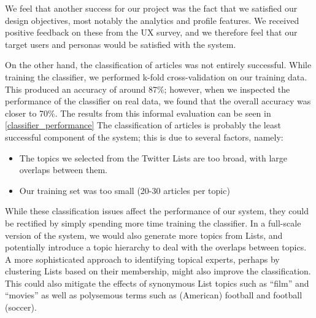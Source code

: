 \documentclass[11pt]{article}
\begin{document}
We feel that another success for our project was the fact that we satisfied our design objectives, most notably the analytics and profile features. We received positive feedback on these from the UX survey, and we therefore feel that our target users and personas would be satisfied with the system.

On the other hand, the classification of articles was not entirely successful. While training the classifier, we performed k-fold cross-validation on our training data. This produced an accuracy of around 87\%; however, when we inspected the performance of the classifier on real data, we found that the overall accuracy was closer to 70\%. The results from this informal evaluation can be seen in \cref{classifier_performance} The classification of articles is probably the least successful component of the system; this is due to several factors, namely:
\begin{itemize}
\item The topics we selected from the Twitter Lists are too broad, with large overlaps between them. 

\item Our training set was too small (20-30 articles per topic)
\end{itemize}
While these classification issues affect the performance of our system, they could be rectified by simply spending more time training the classifier. In a full-scale version of the system, we would also generate more topics from Lists, and potentially introduce a topic hierarchy to deal with the overlaps between topics. 
A more sophisticated approach to identifying topical experts, perhaps by clustering Lists based on their membership, might also improve the classification. This could also mitigate the effects of synonymous List topics such as ``film'' and ``movies'' as well as polysemous terms such as (American) football and football (soccer).
\end{document}
